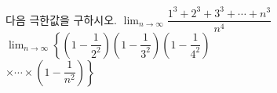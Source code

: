 다음 극한값을 구하시오.
 $\displaystyle\lim_{n\to\infty}\dfrac{1^3+2^3+3^3+\cdots+n^3}{n^4}$
 $\displaystyle\lim_{n\to\infty}\left\{\left(1-\dfrac{1}{2^2}\right)\!\left(1-\dfrac{1}{3^2}\right)\!\left(1-\dfrac{1}{4^2}\right)\right.$\\ \mbox{}\qquad $\left.\times\cdots\times\left(1-\dfrac{1}{n^2}\right)\right\}$
